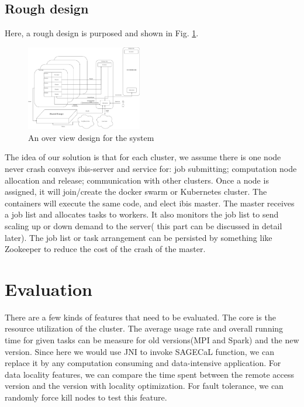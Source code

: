 \documentclass[sigchi]{acmart}
\begin{document}
\subsection{Rough design}
Here, a rough design is purposed and shown in Fig. \ref{fig:overview}. 
\begin{figure}
  \includegraphics[width=0.45\textwidth]{img/Overview_design0.1.png}
    \caption{An over view design for the system}
      \label{fig:overview}
\end{figure}
The idea of our solution is that for each cluster, we assume there is one node never crash conveys ibis-server and service for: job submitting; computation node allocation and release; communication with other clusters.
Once a node is assigned, it will join/create the docker swarm or Kubernetes cluster.  The containers will execute the same code, and elect ibis master.
The master receives a job list and allocates tasks to workers. It also monitors the job list to send scaling up or down demand to the server( this part can be discussed in detail later).
The job list or task arrangement can be persisted by something like Zookeeper to reduce the cost of the crash of the master.

\section{Evaluation}
There are a few kinds of features that need to be evaluated. The core is the resource utilization of the cluster. 
The average usage rate and overall running time for given tasks can be measure for old versions(MPI and Spark) and the new version. 
Since here we would use JNI to invoke SAGECaL function, we can replace it by any computation consuming and data-intensive application.
For data locality features, we can compare the time spent between the remote access version and the version with locality optimization.
For fault tolerance, we can randomly force kill nodes to test this feature.
\end{document}
